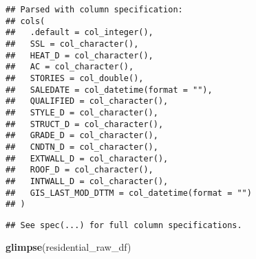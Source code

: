 \documentclass[]{article}
\newenvironment{Shaded}{\begin{snugshade}}{\end{snugshade}}
\newcommand{\KeywordTok}[1]{\textcolor[rgb]{0.13,0.29,0.53}{\textbf{#1}}}
\newcommand{\NormalTok}[1]{#1}
\begin{document}
\begin{verbatim}
## Parsed with column specification:
## cols(
##   .default = col_integer(),
##   SSL = col_character(),
##   HEAT_D = col_character(),
##   AC = col_character(),
##   STORIES = col_double(),
##   SALEDATE = col_datetime(format = ""),
##   QUALIFIED = col_character(),
##   STYLE_D = col_character(),
##   STRUCT_D = col_character(),
##   GRADE_D = col_character(),
##   CNDTN_D = col_character(),
##   EXTWALL_D = col_character(),
##   ROOF_D = col_character(),
##   INTWALL_D = col_character(),
##   GIS_LAST_MOD_DTTM = col_datetime(format = "")
## )
\end{verbatim}

\begin{verbatim}
## See spec(...) for full column specifications.
\end{verbatim}

\begin{Shaded}
\begin{Highlighting}[]
\KeywordTok{glimpse}\NormalTok{(residential_raw_df)}
\end{Highlighting}
\end{Shaded}
\end{document}
